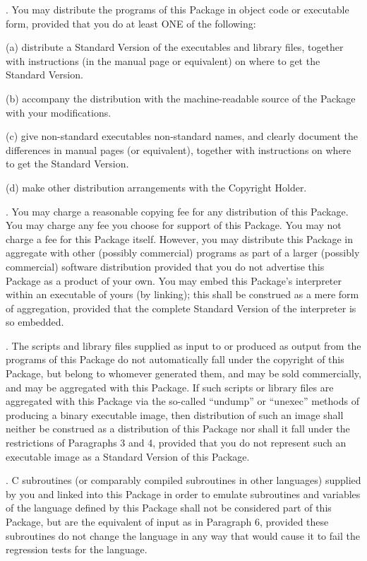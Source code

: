 \documentclass[10pt,letterpaper,titlepage]{article}
\newenvironment{lquote}{\begin{list}{}{}\item[]}{\end{list}}
\begin{document}
. You may distribute the programs of this Package in object code or executable form, provided that you do at least ONE of the following:

\begin{lquote}
(a) distribute a Standard Version of the executables and library files, together with instructions (in the manual page or equivalent) on where to get the Standard Version.

(b) accompany the distribution with the machine-readable source of the Package with your modifications.

(c) give non-standard executables non-standard names, and clearly document the differences in manual pages (or equivalent), together with instructions on where to get the Standard Version.

(d) make other distribution arrangements with the Copyright Holder.
\end{lquote}

. You may charge a reasonable copying fee for any distribution of this Package.  You may charge any fee you choose for support of this Package.  You may not charge a fee for this Package itself.  However, you may distribute this Package in aggregate with other (possibly commercial) programs as part of a larger (possibly commercial) software distribution provided that you do not advertise this Package as a product of your own.  You may embed this Package's interpreter within an executable of yours (by linking); this shall be construed as a mere form of aggregation, provided that the complete Standard Version of the interpreter is so embedded.
\vspace{8pt}

. The scripts and library files supplied as input to or produced as output from the programs of this Package do not automatically fall under the copyright of this Package, but belong to whomever generated them, and may be sold commercially, and may be aggregated with this Package.  If such scripts or library files are aggregated with this Package via the so-called ``undump'' or ``unexec'' methods of producing a binary executable image, then distribution of such an image shall neither be construed as a distribution of this Package nor shall it fall under the restrictions of Paragraphs 3 and 4, provided that you do not represent such an executable image as a Standard Version of this Package.
\vspace{8pt}

. C subroutines (or comparably compiled subroutines in other languages) supplied by you and linked into this Package in order to emulate subroutines and variables of the language defined by this Package shall not be considered part of this Package, but are the equivalent of input as in Paragraph 6, provided these subroutines do not change the language in any way that would cause it to fail the regression tests for the language.
\vspace{8pt}
\end{document}
